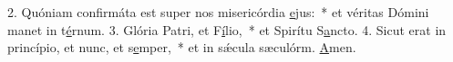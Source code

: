 2. Quóniam confirmáta est super nos misericórdia \uline{e}jus:~* et véritas Dómini manet in t\uline{é}rnum.
3. Glória Patri, et F\uline{í}lio,~* et Spirítu S\uline{a}ncto.
4. Sicut erat in princípio, et nunc, et s\uline{e}mper,~* et in sǽcula sæculórm. \uline{A}men.
